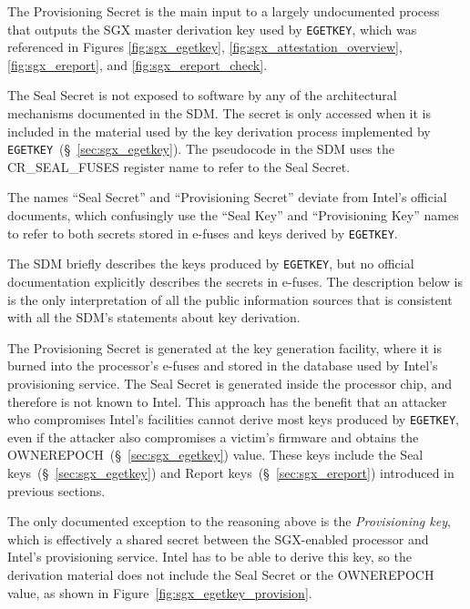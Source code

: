 
The Provisioning Secret is the main input to a largely undocumented process
that outputs the SGX master derivation key used by \texttt{EGETKEY}, which was
referenced in Figures \ref{fig:sgx_egetkey},
\ref{fig:sgx_attestation_overview}, \ref{fig:sgx_ereport}, and
\ref{fig:sgx_ereport_check}.
%
%

The Seal Secret is not exposed to software by any of the architectural
mechanisms documented in the SDM. The secret is only accessed when it is
included in the material used by the key derivation process implemented by
\texttt{EGETKEY}~(\S~\ref{sec:sgx_egetkey}). The pseudocode in the SDM uses the
CR\_SEAL\_FUSES register name to refer to the Seal Secret.

The names ``Seal Secret'' and ``Provisioning Secret'' deviate from Intel's
official documents, which confusingly use the ``Seal Key'' and ``Provisioning
Key'' names to refer to both secrets stored in e-fuses and keys derived by
\texttt{EGETKEY}.

The SDM briefly describes the keys produced by \texttt{EGETKEY}, but no
official documentation explicitly describes the secrets in e-fuses. The
description below is is the only interpretation of all the public information
sources that is consistent with all the SDM's statements about key derivation.

The Provisioning Secret is generated at the key generation facility, where it
is burned into the processor's e-fuses and stored in the database used by
Intel's provisioning service. The Seal Secret is generated inside the processor
chip, and therefore is not known to Intel. This approach has the benefit that
an attacker who compromises Intel's facilities cannot derive most keys produced
by \texttt{EGETKEY}, even if the attacker also compromises a victim's firmware
and obtains the OWNEREPOCH~(\S~\ref{sec:sgx_egetkey}) value. These keys include
the Seal keys~(\S~\ref{sec:sgx_egetkey}) and Report
keys~(\S~\ref{sec:sgx_ereport}) introduced in previous sections.

The only documented exception to the reasoning above is the
\textit{Provisioning key}, which is effectively a shared secret between the
SGX-enabled processor and Intel's provisioning service. Intel has to be able to
derive this key, so the derivation material does not include the Seal Secret or
the OWNEREPOCH value, as shown in Figure~\ref{fig:sgx_egetkey_provision}.

